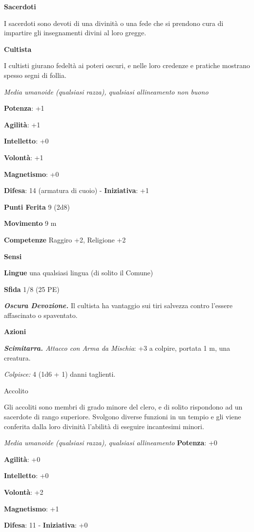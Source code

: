 \begin{multicols}{2}
\textbf{Sacerdoti}

I sacerdoti sono devoti di una divinità o una fede che si prendono cura
di impartire gli insegnamenti divini al loro gregge.

\textbf{Cultista}

I cultisti giurano fedeltà ai poteri oscuri, e nelle loro credenze e
pratiche mostrano spesso segni di follia.

\emph{Media umanoide (qualsiasi razza), qualsiasi allineamento non
buono}

\textbf{Potenza}: +1

\textbf{Agilità}: +1

\textbf{Intelletto}: +0

\textbf{Volontà}: +1

\textbf{Magnetismo}: +0

\textbf{Difesa}: 14 (armatura di cuoio) - \textbf{Iniziativa}: +1

\textbf{Punti Ferita} 9 (2d8)

\textbf{Movimento} 9 m

\textbf{Competenze} Raggiro +2, Religione +2

\textbf{Sensi} 

\textbf{Lingue} una qualsiasi lingua (di solito il Comune)

\textbf{Sfida} 1/8 (25 PE)\smallskip

\emph{\textbf{Oscura Devozione.}} Il cultista ha vantaggio sui tiri
salvezza contro l'essere affascinato o spaventato.

\smallskip\textbf{Azioni}

\emph{\textbf{Scimitarra.} Attacco con Arma da Mischia}: +3 a colpire,
portata 1 m, una creatura.

\emph{Colpisce:} 4 (1d6 + 1) danni taglienti.

Accolito

Gli accoliti sono membri di grado minore del clero, e di solito
rispondono ad un sacerdote di rango superiore. Svolgono diverse funzioni
in un tempio e gli viene conferita dalla loro divinità l'abilità di
eseguire incantesimi minori.

\emph{Media umanoide (qualsiasi razza), qualsiasi allineamento}
\textbf{Potenza}: +0

\textbf{Agilità}: +0

\textbf{Intelletto}: +0

\textbf{Volontà}: +2

\textbf{Magnetismo}: +1

\textbf{Difesa}: 11 - \textbf{Iniziativa}: +0


\end{multicols}
